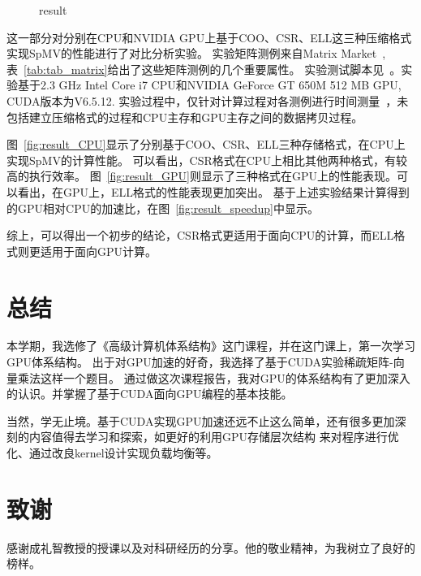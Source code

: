 \documentclass[11pt,twocolumn]{article}
\begin{document}
\begin{figure}
{
	} 
  	\caption{result} 
  	\label{fig:result} %
\end{figure}


这一部分对分别在CPU和NVIDIA GPU上基于COO、CSR、ELL这三种压缩格式实现SpMV的性能进行了对比分析实验。
实验矩阵测例来自Matrix Market~\cite{MatrixMarket},表~\ref{tab:tab_matrix}给出了这些矩阵测例的几个重要属性。
实验测试脚本见~\cite{wuzw}。实验基于2.3 GHz Intel Core i7 CPU和NVIDIA GeForce GT 650M 512 MB GPU, CUDA版本为V6.5.12.
实验过程中，仅针对计算过程对各测例进行时间测量~\cite{MetricsImplementation}，未包括建立压缩格式的过程和CPU主存和GPU主存之间的数据拷贝过程。

图~\ref{fig:result_CPU}显示了分别基于COO、CSR、ELL三种存储格式，在CPU上实现SpMV的计算性能。
可以看出，CSR格式在CPU上相比其他两种格式，有较高的执行效率。
图~\ref{fig:result_GPU}则显示了三种格式在GPU上的性能表现。可以看出，在GPU上，ELL格式的性能表现更加突出。
基于上述实验结果计算得到的GPU相对CPU的加速比，在图~\ref{fig:result_speedup}中显示。

综上，可以得出一个初步的结论，CSR格式更适用于面向CPU的计算，而ELL格式则更适用于面向GPU计算。

\section{总结}
本学期，我选修了《高级计算机体系结构》这门课程，并在这门课上，第一次学习GPU体系结构。
出于对GPU加速的好奇，我选择了基于CUDA实验稀疏矩阵-向量乘法这样一个题目。
通过做这次课程报告，我对GPU的体系结构有了更加深入的认识。并掌握了基于CUDA面向GPU编程的基本技能。

当然，学无止境。基于CUDA实现GPU加速还远不止这么简单，还有很多更加深刻的内容值得去学习和探索，如更好的利用GPU存储层次结构
来对程序进行优化、通过改良kernel设计实现负载均衡等。

\section{致谢}
感谢成礼智教授的授课以及对科研经历的分享。他的敬业精神，为我树立了良好的榜样。

\renewcommand\refname{引用}

{}
\end{document}
